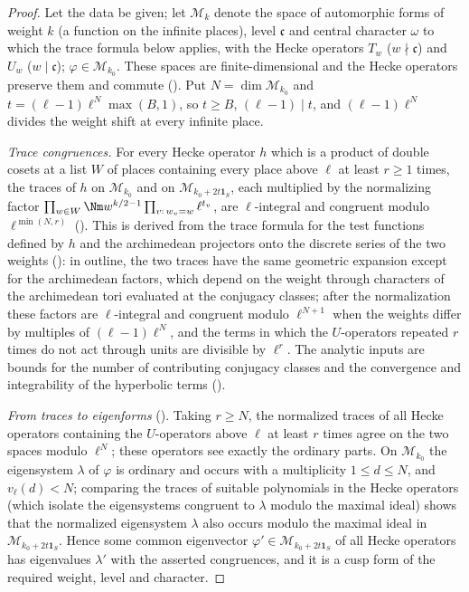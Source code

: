 \begin{proof}
Let the data be given; let $\mathcal M_k$ denote the space of automorphic forms of weight $k$ (a function on the infinite places), level $\mathfrak c$
and central character $\omega$ to which the trace formula below applies, with the Hecke operators $T_w$ ($w\nmid\mathfrak c$) and $U_w$ ($w\mid\mathfrak c$);
$\varphi\in\mathcal M_{k_0}$. These spaces are finite-dimensional and the Hecke operators preserve them and commute
(). Put $N=\dim\mathcal M_{k_0}$ and
$t=(\ell-1)\ell^N\max(B,1)$, so $t\ge B$, $(\ell-1)\mid t$, and $(\ell-1)\ell^N$ divides the weight shift at every infinite place.

\emph{Trace congruences.} For every Hecke operator $h$ which is a product of double cosets at a list $W$ of places containing every place
above $\ell$ at least $r\ge1$ times, the traces of $h$ on $\mathcal M_{k_0}$ and on $\mathcal M_{k_0+2t\mathbf 1_S}$, each multiplied by the normalizing factor
$\prod_{w\in W}\Nm w^{k/2-1}\prod_{v:\,w_v=w}\ell^{t_v}$, are $\ell$-integral and congruent modulo $\ell^{\min(N,r)}$ ().
This is derived from the trace formula for the test functions defined by $h$ and the archimedean projectors onto the discrete series of
the two weights (): in outline, the two traces have the same geometric expansion except for the
archimedean factors, which depend on the weight through characters of the archimedean tori evaluated at the conjugacy classes; after the
normalization these factors are $\ell$-integral and congruent modulo $\ell^{N+1}$ when the weights differ by multiples of $(\ell-1)\ell^N$, and the
terms in which the $U$-operators repeated $r$ times do not act through units are divisible by $\ell^r$. The analytic inputs are bounds for
the number of contributing conjugacy classes and the convergence and integrability of the hyperbolic terms
().

\emph{From traces to eigenforms} (). Taking $r\ge N$, the normalized traces of all Hecke operators
containing the $U$-operators above $\ell$ at least $r$ times agree on the two spaces modulo $\ell^N$; these operators see exactly the ordinary
parts. On $\mathcal M_{k_0}$ the eigensystem $\lambda$ of $\varphi$ is ordinary and occurs with a multiplicity $1\le d\le N$, and $v_\ell(d)<N$; comparing the
traces of suitable polynomials in the Hecke operators (which isolate the eigensystems congruent to $\lambda$ modulo the maximal ideal) shows
that the normalized eigensystem $\lambda$ also occurs modulo the maximal ideal in $\mathcal M_{k_0+2t\mathbf 1_S}$. Hence some common eigenvector
$\varphi'\in\mathcal M_{k_0+2t\mathbf 1_S}$ of all Hecke operators has eigenvalues $\lambda'$ with the asserted congruences, and it is a cusp form of the required
weight, level and character.
\end{proof}

